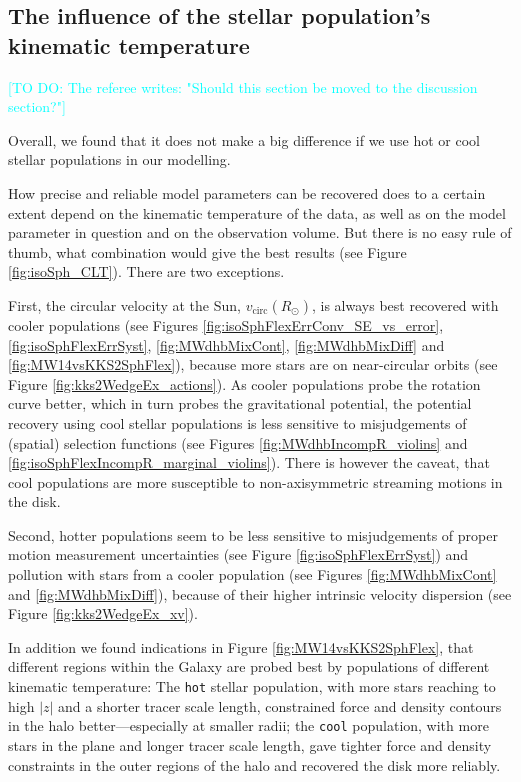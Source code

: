 \documentclass[iop,revtex4]{emulateapj}
\newcommand{\HW}[1]{\textcolor{Cyan}{#1}}
\begin{document}
\subsection{The influence of the stellar population's kinematic temperature} \label{sec:results_temperature}

\HW{[TO DO: The referee writes: "Should this section be moved to the discussion section?"]}

Overall, we found that it does not make a big difference if we use hot or cool stellar populations in our modelling.

How precise and reliable model parameters can be recovered does to a certain extent depend on the kinematic temperature of the data, as well as on the model parameter in question and on the observation volume. But there is no easy rule of thumb, what combination would give the best results (see Figure \ref{fig:isoSph_CLT}). There are two exceptions.

First, the circular velocity at the Sun, $v_\text{circ}(R_\odot)$, is always best recovered with cooler populations (see Figures \ref{fig:isoSphFlexErrConv_SE_vs_error}, \ref{fig:isoSphFlexErrSyst}, \ref{fig:MWdhbMixCont}, \ref{fig:MWdhbMixDiff} and \ref{fig:MW14vsKKS2SphFlex}), because more stars are on near-circular orbits (see Figure \ref{fig:kks2WedgeEx_actions}). As cooler populations probe the rotation curve better, which in turn probes the gravitational potential, the potential recovery using cool stellar populations is less sensitive to misjudgements of (spatial) selection functions (see Figures \ref{fig:MWdhbIncompR_violins} and \ref{fig:isoSphFlexIncompR_marginal_violins}). There is however the caveat, that cool populations are more susceptible to non-axisymmetric streaming motions in the disk.

Second, hotter populations seem to be less sensitive to misjudgements of proper motion measurement uncertainties (see Figure \ref{fig:isoSphFlexErrSyst}) and pollution with stars from a cooler population (see Figures \ref{fig:MWdhbMixCont} and \ref{fig:MWdhbMixDiff}), because of their higher intrinsic velocity dispersion (see Figure \ref{fig:kks2WedgeEx_xv}).

In addition we found indications in Figure \ref{fig:MW14vsKKS2SphFlex}, that different regions within the Galaxy are probed best by populations of different kinematic temperature: The \texttt{hot} stellar population, with more stars reaching to high $|z|$ and a shorter tracer scale length, constrained force and density contours in the halo better---especially at smaller radii; the \texttt{cool} population, with more stars in the plane and longer tracer scale length, gave tighter force and density constraints in the outer regions of the halo and recovered the disk more reliably.
\end{document}
